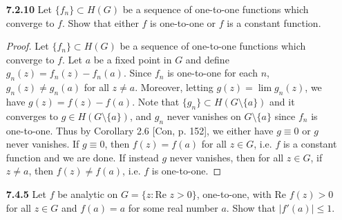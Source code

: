 \documentclass[11pt,oneside,english]{amsart}
\theoremstyle{definition}
\renewcommand{\Re}{\text{Re }}
\begin{document}
\begin{enumerate}[leftmargin=*]
\begin{proof}
%
\end{proof}


\pagebreak

\item[\textbf{7.2.10}] Let $\{f_n\}\subset H(G)$ be a sequence of one-to-one functions which converge to $f$. Show that either $f$ is one-to-one or $f$ is a constant function.

\begin{proof}
Let $\{f_n\}\subset H(G)$ be a sequence of one-to-one functions which converge to $f$. Let $a$ be a fixed point in $G$ and define $g_n(z)=f_n(z)-f_n(a)$. Since $f_n$ is one-to-one for each $n$, $g_n(z)\neq g_n(a)$ for all $z\neq a$. Moreover, letting $g(z)=\lim g_n(z)$, we have $g(z)= f(z)-f(a)$. Note that $\{g_n\}\subset H(G\setminus \{a\})$ and it converges to $g\in H(G\setminus \{a\})$, and $g_n$ never vanishes on $G\setminus \{a\}$ since $f_n$ is one-to-one. Thus by Corollary 2.6 [Con, p. 152], we either have $g\equiv 0$ or $g$ never vanishes. If $g\equiv 0$, then $f(z)=f(a)$ for all $z\in G$, i.e. $f$ is a constant function and we are done. If instead $g$ never vanishes, then for all $z\in G$, if $z\neq a$, then $f(z)\neq f(a)$, i.e. $f$ is one-to-one.
\end{proof}

\pagebreak

\item[\textbf{7.4.5}] Let $f$ be analytic on $G=\{z:\Re z>0\}$, one-to-one, with $\Re f(z)>0$ for all $z\in G$ and $f(a)=a$ for some real number $a$. Show that $|f'(a)|\leq 1$.


\end{enumerate}
\end{document}
